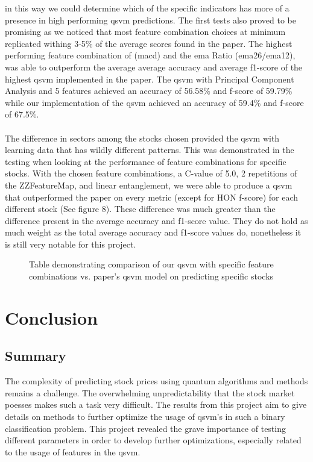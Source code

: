 \documentclass{article}
\begin{document}
in this way we could determine which of the specific indicators has more of a presence in high performing \gls{qsvm} predictions. The first tests also proved to be promising as we noticed that most feature combination choices 
at minimum replicated withing 3-5\% of the average scores found in the paper. The highest performing feature combination of (\gls{macd}) and the \gls{ema} Ratio (\gls{ema}26/\gls{ema}12), was able to outperform the average 
average accuracy and average f1-score of the highest \gls{qsvm} implemented in the paper. The \gls{qsvm} with Principal Component Analysis and 5 features achieved an accuracy of 56.58\% and f-score of 
59.79\% while our implementation of the \gls{qsvm} achieved an accuracy of 59.4\% and f-score of 67.5\%. 
\\
\\
The difference in sectors among the stocks chosen provided the \gls{qsvm} with learning data that has wildly different patterns. This was demonstrated in the testing when looking at the 
performance of feature combinations for specific stocks. With the chosen feature combinations, a C-value of 5.0, 2 repetitions of the ZZFeatureMap, and linear entanglement, we were 
able to produce a \gls{qsvm} that outperformed the paper on every metric (except for HON f-score) for each different stock (See figure 8). These difference was much greater than the difference present in the average accuracy and f1-score 
value. They do not hold as much weight as the total average accuracy and f1-score values do, nonetheless it is still very notable for this project. 
\begin{figure}[H]
    \centering
    \caption{Table demonstrating comparison of our \gls{qsvm} with specific feature combinations vs. paper's \gls{qsvm} model on predicting specific stocks}
    \label{fig:8}
\end{figure}
\noindent
\section{Conclusion}
\subsection{Summary}
The complexity of predicting stock prices using quantum algorithms and methods remains a challenge. The overwhelming unpredictability that 
the stock market poesses makes such a task very difficult. The results from this project aim to give details on methods to further optimize
the usage of \gls{qsvm}'s in such a binary classification problem. This project revealed the grave importance of testing different parameters in order to 
develop further optimizations, especially related to the usage of features in the \gls{qsvm}. 
\end{document}
